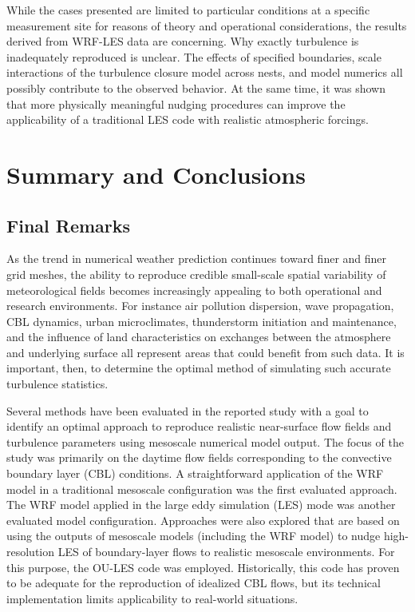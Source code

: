 While the cases presented are limited to particular conditions at a specific measurement site for reasons of theory and operational considerations, the results derived from WRF-LES data are concerning. Why exactly turbulence is inadequately reproduced is unclear. The effects of specified boundaries, scale interactions of the turbulence closure model across nests, and model numerics all possibly contribute to the observed behavior. At the same time, it was shown that more physically meaningful nudging procedures can improve the applicability of a traditional LES code with realistic atmospheric forcings.

\chapter{Summary and Conclusions}
\label{summary-7}

\section{Final Remarks}
\label{remarks-71}

As the trend in numerical weather prediction continues toward finer and finer grid meshes, the ability to reproduce credible small-scale spatial variability of meteorological fields becomes increasingly appealing to both operational and research environments. For instance air pollution dispersion, wave propagation, CBL dynamics, urban microclimates, thunderstorm initiation and maintenance, and the influence of land characteristics on exchanges between the atmosphere and underlying surface all represent areas that could benefit from such data. It is important, then, to determine the optimal method of simulating such accurate turbulence statistics. 

Several methods have been evaluated in the reported study with a goal to identify an optimal approach to reproduce realistic near-surface flow fields and turbulence parameters using mesoscale numerical model output. The focus of the study was primarily on the daytime flow fields corresponding to the convective boundary layer (CBL) conditions. A straightforward application of the WRF model in a traditional mesoscale configuration was the first evaluated approach. The WRF model applied in the large eddy simulation (LES) mode was another evaluated model configuration. Approaches were also explored that are based on using the outputs of mesoscale models (including the WRF model) to nudge high-resolution LES of boundary-layer flows to realistic mesoscale environments. For this purpose, the OU-LES code was employed. Historically, this code has proven to be adequate for the reproduction of idealized CBL flows, but its technical implementation limits applicability to real-world situations.

